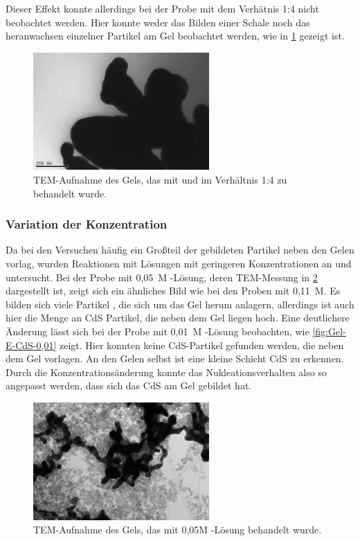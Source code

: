 		Dieser Effekt konnte allerdings bei der Probe mit dem Verhätnis 1:4 nicht beobachtet werden.
		Hier konnte weder das Bilden einer Schale noch das heranwachsen einzelner Partikel am Gel beobachtet werden, wie in \cref{fig:Gel-E-ZnCl-1-4} gezeigt ist.
		
		\begin{figure}[H]
			\centering
			\includegraphics[width=0.6\textwidth]{Bilder/Gel-E-ZnCl-1-4} 	
			\caption{TEM-Aufnahme des Gels, das mit  und  im Verhältnis 1:4  zu  behandelt wurde.}
			\label{fig:Gel-E-ZnCl-1-4}
		\end{figure}
	
		\subsubsection{Variation der Konzentration}
		Da bei den Versuchen häufig ein Großteil der gebildeten Partikel neben den Gelen vorlag, wurden Reaktionen mit Lösungen mit geringeren Konzentrationen an  und  untersucht.
		Bei der Probe mit 0,05~M -Lösung, deren TEM-Messung in \cref{fig:Gel-E-CdS-0,05} dargestellt ist,  zeigt sich ein ähnliches Bild wie bei den Proben mit 0,11~M.
		Es bilden sich viele Partikel , die sich um das Gel herum anlagern, allerdings ist auch hier die Menge an CdS Partikel, die neben dem Gel liegen hoch.
		Eine deutlichere Änderung lässt sich bei der Probe mit 0,01~M -Lösung beobachten, wie \cref{fig:Gel-E-CdS-0,01} zeigt.
		Hier konnten keine CdS-Partikel gefunden werden, die neben dem Gel vorlagen.
		An den Gelen selbst ist eine kleine Schicht CdS zu erkennen.
		Durch die Konzentrationsänderung konnte das Nukleationsverhalten also so angepasst werden, dass sich das CdS am Gel gebildet hat.
		
		\begin{figure}[H]
			\centering
			\includegraphics[width=0.6\textwidth]{Bilder/Gel-E-CdS-0,05} 	
			\caption{TEM-Aufnahme des Gels, das mit 0,05M -Lösung behandelt wurde.}
			\label{fig:Gel-E-CdS-0,05}
		\end{figure}
	
